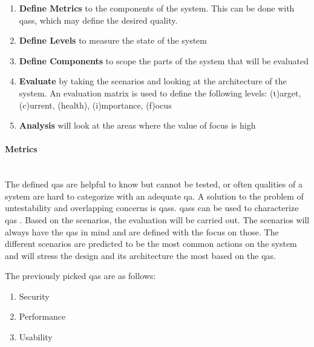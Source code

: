 \begin{enumerate}
    \item \textbf{Define Metrics} to the components of the system. This can be done with \glspl{qas}, which may define the desired quality.
    \item \textbf{Define Levels} to measure the state of the system
    \item \textbf{Define Components} to scope the parts of the system that will be evaluated
    \item \textbf{Evaluate} by taking the scenarios and looking at the architecture of the system. An evaluation matrix is used to define the following levels: (t)arget, (c)urrent, (health), (i)mportance, (f)ocus
    \item \textbf{Analysis} will look at the areas where the value of focus is high
\end{enumerate}

\vspace{0.5cm}
\paragraph{Metrics}\mbox{}\\

The defined \glspl{qa} are helpful to know but cannot be tested, or often qualities of a system are hard to categorize with an adequate \gls{qa}. A solution to the problem of untestability and overlapping concerns is \glspl{qas}. \glspl{qas} can be used to characterize \glspl{qa} \cite{BassSoftwareArchitecture2003}. Based on the scenarios, the evaluation will be carried out. The scenarios will always have the \glspl{qa} in mind and are defined with the focus on those. The different scenarios are predicted to be the most common actions on the system and will stress the design and its architecture the most based on the \glspl{qa}.

The previously picked \glspl{qa} are as follows:

\begin{enumerate}
    \item Security
    \item Performance
    \item Usability
\end{enumerate}

